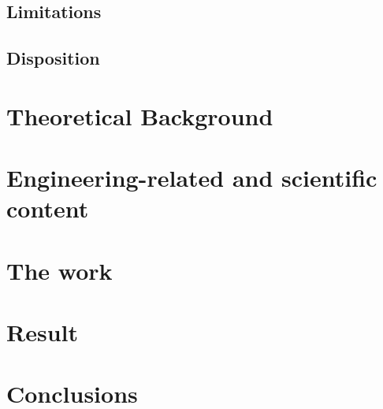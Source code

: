 \documentclass[11pt, a4paper, onecolumn]{article}
\begin{document}
	
	
	\subsection{Limitations}
	
	\subsection{Disposition}
	
	\newpage
	
	\section{Theoretical Background}
	\newpage
	
	\section{Engineering-related and scientific content}
	\newpage
	
	\section{The work}
	\newpage
	
	\section{Result}
	\newpage
	
	\section{Conclusions}
	\newpage
	
	
\end{document}
